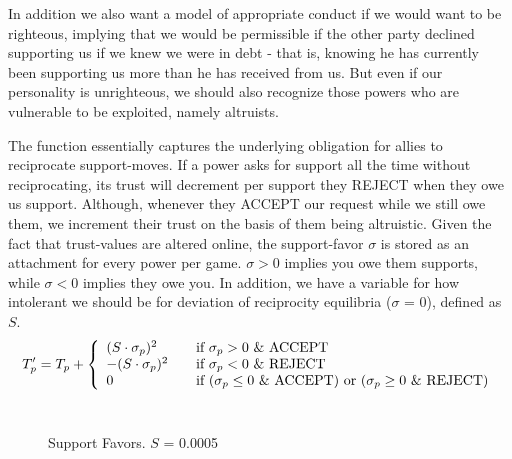 \documentclass[a4paper]{article} %
\begin{document}
 In addition we also want a model of appropriate conduct if we would want to be righteous, implying that we would be permissible if the other party declined supporting us if we knew we were in debt - that is, knowing he has currently been supporting us more than he has received from us. But even if our personality is unrighteous, we should also recognize those powers who are vulnerable to be exploited, namely altruists.

The function essentially captures the underlying obligation for allies to reciprocate support-moves. If a power asks for support all the time without reciprocating, its trust will decrement per support they REJECT when they owe us support. Although, whenever they  ACCEPT our request while we still owe them, we increment their trust on the basis of them being altruistic. Given the fact that trust-values are altered online, the support-favor $\sigma$ is stored as an attachment for every power per game. $\sigma > 0 $ implies you owe them supports, while $\sigma < 0$ implies they owe you. In addition, we have a variable for how intolerant we should be for deviation of reciprocity equilibria ($\sigma$ = 0), defined as $S$.\\


  \[ T'_p = T_p + \left\{ 
  \begin{array}{l l}
    (S \cdot \sigma_p)^2 & \quad \text{if $\sigma_p > 0$ \& ACCEPT}\\
    -(S \cdot \sigma_p)^2 & \quad \text{if $\sigma_p < 0$ \& REJECT}\\
    \text{0} & \quad \text{if ($\sigma_p \le 0$ \& ACCEPT) or ($\sigma_p \geq 0$ \& REJECT)}
    
  \end{array} \right.\]
  \\
\begin{figure}[H]
\centering
{}
\caption{Support Favors. $S$ = 0.0005}
\label{fig:graph3}
\end{figure}
\end{document}
